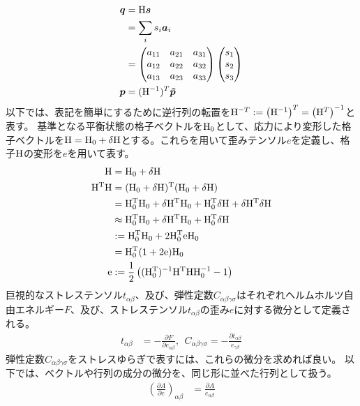 \documentclass[11pt,a4paper,uplatex]{jsarticle}
\begin{document}
\begin{align}
    \bm{q} &= {\rm H} \bm{s} \\
    &= \sum_{i} s_{i} \bm{a}_{i} \\
    &=          \begin{pmatrix} 
        a_{11} & a_{21} & a_{31} \\
        a_{12} & a_{22} & a_{32} \\
        a_{13} & a_{23} & a_{33} \\
    \end{pmatrix} 
    \begin{pmatrix}
        s_{1} \\ s_{2} \\ s_{3} 
    \end{pmatrix} \\
    \bm{p} &= ({\rm H}^{-1})^{T} \bm{\tilde{p}} 
\end{align}  
以下では、表記を簡単にするために逆行列の転置を${\rm H}^{-T}:=\left({\rm H}^{-1}\right)^{T}=\left({\rm H}^{T}\right)^{-1}$と表す。
基準となる平衡状態の格子ベクトルを${\rm H}_{0}$として、応力により変形した格子ベクトルを${\rm H}={\rm H}_{0}+{\rm \delta H}$とする。これらを用いて歪みテンソル$e$を定義し、格子${\rm H}$の変形を$e$を用いて表す。
\begin{align}
    {\rm H} &= {\rm H_{0} + \delta H} \\
    {\rm H^{T} H} &= {\rm (H_{0} + \delta H)^{T} (H_{0} + \delta H)} \\
    &= {\rm H_{0}^{T} H_{0} + \delta H^{T} H_{0} + H_{0}^{T} \delta H + \delta H^{T} \delta H} \\
    &\approx {\rm H_{0}^{T} H_{0} + \delta H^{T} H_{0} + H_{0}^{T} \delta H } \\
    &:= {\rm H_{0}^{T} H_{0} + 2 H_{0}^{T} e H_{0}} \\
    &= {\rm H_{0}^T (1 + 2 e) H_{0}} \\
{\rm e} &:= {\rm \frac{1}{2}\left((H_{0}^{T})^{-1} H^{T} H H_{0}^{-1} - 1 \right) } \\
\end{align}
巨視的なストレステンソル$t_{\alpha \beta}$、及び、弾性定数$C_{\alpha \beta \gamma \sigma}$はそれぞれヘルムホルツ自由エネルギー$F$、及び、ストレステンソル$t_{\alpha \beta}$の歪み$e$に対する微分として定義される。
\begin{align}
 t_{\alpha \beta} &= -\frac{\partial F}{\partial e_{\alpha \beta}}, \ \
 C_{\alpha \beta \gamma \sigma} = -\frac{\partial t_{\alpha \beta}}{e_{\gamma \beta}}
\end{align}
弾性定数$C_{\alpha \beta \gamma \sigma}$をストレスゆらぎで表すには、これらの微分を求めれば良い。
以下では、ベクトルや行列の成分の微分を、同じ形に並べた行列として扱う。
\begin{align}
    \left( \frac{\partial A}{\partial e} \right)_{\alpha \beta} &= \frac{\partial A}{e_{\alpha \beta}}
\end{align}
\end{document}
